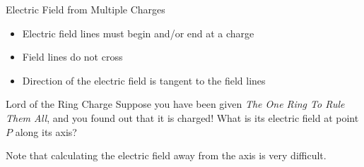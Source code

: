 \documentclass[12pt,aspectratio=169]{beamer}
\begin{document}
\begin{frame}{Electric Field from Multiple Charges}
  \begin{center}
  \end{center}
  \begin{itemize}
  \item Electric field lines must begin and/or end at a charge
  \item Field lines do not cross
  \item Direction of the electric field is tangent to the field lines
  \end{itemize}
\end{frame}






\begin{frame}{Lord of the Ring Charge}
  Suppose you have been given \emph{The One Ring To Rule Them All}, and you
  found out that it is charged! What is its electric field at point $P$ along
  its axis?
  \begin{center}
  \end{center}
  Note that calculating the electric field away from the axis is very
  difficult.
\end{frame}
\end{document}
